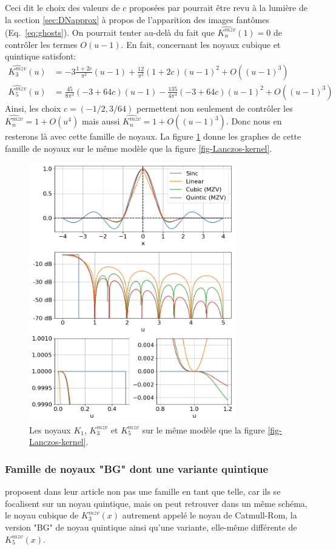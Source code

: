 \documentclass[11pt,twoside]{article}
\newcommand{\nn}{\nonumber}
\begin{document}
Ceci dit le choix des valeurs de $c$ proposées par \cite{Meijering1999} pourrait être revu à la lumière de la section \ref{sec:DNapprox} à propos de l'apparition des images fantômes (Eq.~\ref{eq:ghosts}). On pourrait tenter au-delà du fait que $\widehat{K^{mzv}_n}(1)=0$ de contrôler les termes $O(u-1)$. En fait, concernant les noyaux cubique et quintique satisfont:
\begin{align}
\widehat{K^{mzv}_3}(u) &= -3\frac{1+2c}{\pi^2} (u-1) + \frac{12}{\pi^2}(1+2c)(u-1)^2 + O((u-1)^3) \nn\\
\widehat{K^{mzv}_5}(u) &= \frac{45}{8\pi^4}(-3+64c) (u-1) -\frac{135}{4\pi^4}(-3+64c) (u-1)^2 + O((u-1)^3)
\end{align}
Ainsi, les choix $c=(-1/2,3/64)$ permettent non seulement de contrôler les $\widehat{K^{mzv}_n}=1+O(u^4)$ mais aussi $\widehat{K^{mzv}_n}=1+O((u-1)^3)$. Donc nous en resterons là avec cette famille de noyaux. La figure \ref{fig-mzv-kernel} donne les graphes de cette famille de noyaux sur le même modèle que la figure \ref{fig-Lanczos-kernel}. 
\begin{figure}
\centering
\includegraphics[width=0.8\textwidth]{fig6.png}
\caption{Les noyaux $K_1$, $K^{mzv}_3$ et $K^{mzv}_5$ sur le même modèle que la figure \ref{fig-Lanczos-kernel}.}
\label{fig-mzv-kernel}
\end{figure}
%
\subsubsection{Famille de noyaux "BG" dont une variante quintique}
\label{sec:BGKernels}
% 
\cite{2014PASP..126..287B} proposent dans leur article non pas une famille en tant que telle, car ils se focalisent sur un noyau quintique, mais on peut retrouver dans un même schéma, le noyau cubique de $K^{mzv}_3(x)$ autrement appelé le noyau de Catmull-Rom,  la version "BG" de noyau quintique ainsi qu'une variante, elle-même différente de $K^{mzv}_5(x)$.
\end{document}
